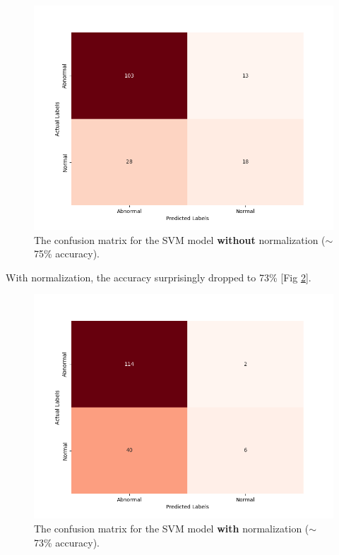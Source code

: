 \documentclass{article}
\theoremstyle{plain}
\theoremstyle{definition}
\theoremstyle{remark}
\begin{document}
\begin{figure}[!h]
    \centering
    \includegraphics[scale=0.405]{confusion_matrix}
    \caption{The confusion matrix for the SVM model \textbf{without} normalization ($\sim$75\% accuracy).}
    \label{fig:confusionmatrix1}
\end{figure}

With normalization, the accuracy surprisingly dropped to 73\% [Fig \ref{fig:confusionmatrix2}].

\begin{figure}[!h]
    \centering
    \includegraphics[scale=0.405]{confusion_matrix2}
    \caption{The confusion matrix for the SVM model \textbf{with} normalization ($\sim$73\% accuracy).}
    \label{fig:confusionmatrix2}
\end{figure}
\end{document}

